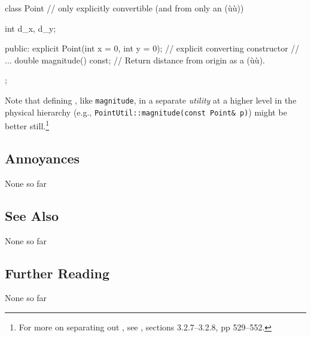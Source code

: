 \begin{emcppslisting}[language=C++]
class Point  // only explicitly convertible (and from only an (ù{}ù))
{
    int d_x, d_y;

public:
    explicit Point(int x = 0, int y = 0);  // explicit converting constructor
    // ...
    double magnitude() const;  // Return distance from origin as a (ù{}ù).
};
\end{emcppslisting}
    
\noindent Note that defining , like
\lstinline!magnitude!, in a separate \emph{utility} at a higher level in the
physical hierarchy (e.g., \lstinline!PointUtil::magnitude(const!~\lstinline!Point&!~\lstinline!p)!) might be better still.{\cprotect\footnote{For more on
separating out , see
  \cite{lakos20}, sections 3.2.7--3.2.8, pp 529--552.}}

\subsection[Annoyances]{Annoyances}\label{annoyances}

None so far

\subsection[See Also]{See Also}\label{see-also}

None so far

\subsection[Further Reading]{Further Reading}\label{further-reading}

None so far

